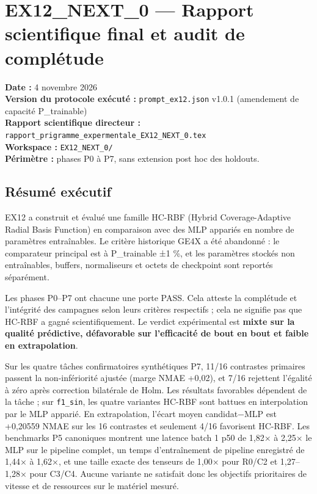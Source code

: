 \documentclass[
]{article}
\author{}
\date{}
\begin{document}
{
\setcounter{tocdepth}{3}
\tableofcontents
}
\section{EX12\_NEXT\_0 --- Rapport scientifique final et audit de
complétude}\label{ex12_next_0-rapport-scientifique-final-et-audit-de-compluxe9tude}

\textbf{Date :} 4 novembre 2026\\
\textbf{Version du protocole exécuté :} \texttt{prompt\_ex12.json}
v1.0.1 (amendement de capacité P\_trainable)\\
\textbf{Rapport scientifique directeur :}
\texttt{rapport\_prigramme\_expermentale\_EX12\_NEXT\_0.tex}\\
\textbf{Workspace :} \texttt{EX12\_NEXT\_0/}\\
\textbf{Périmètre :} phases P0 à P7, sans extension post hoc des
holdouts.

\subsection{Résumé exécutif}\label{ruxe9sumuxe9-exuxe9cutif}

EX12 a construit et évalué une famille HC-RBF (Hybrid Coverage-Adaptive
Radial Basis Function) en comparaison avec des MLP appariés en nombre de
paramètres entraînables. Le critère historique GE4X a été abandonné : le
comparateur principal est à P\_trainable ±1 \%, et les paramètres
stockés non entraînables, buffers, normaliseurs et octets de checkpoint
sont reportés séparément.

Les phases P0--P7 ont chacune une porte PASS. Cela atteste la complétude
et l'intégrité des campagnes selon leurs critères respectifs ; cela ne
signifie pas que HC-RBF a gagné scientifiquement. Le verdict
expérimental est \textbf{mixte sur la qualité prédictive, défavorable
sur l'efficacité de bout en bout et faible en extrapolation}.

Sur les quatre tâches confirmatoires synthétiques P7, 11/16 contrastes
primaires passent la non-infériorité ajustée (marge NMAE +0,02), et 7/16
rejettent l'égalité à zéro après correction bilatérale de Holm. Les
résultats favorables dépendent de la tâche ; sur \texttt{f1\_sin}, les
quatre variantes HC-RBF sont battues en interpolation par le MLP
apparié. En extrapolation, l'écart moyen candidat−MLP est +0,20559 NMAE
sur les 16 contrastes et seulement 4/16 favorisent HC-RBF. Les
benchmarks P5 canoniques montrent une latence batch 1 p50 de 1,82× à
2,25× le MLP sur le pipeline complet, un temps d'entraînement de
pipeline enregistré de 1,44× à 1,62×, et une taille exacte des tenseurs
de 1,00× pour R0/C2 et 1,27--1,28× pour C3/C4. Aucune variante ne
satisfait donc les objectifs prioritaires de vitesse et de ressources
sur le matériel mesuré.
\end{document}
